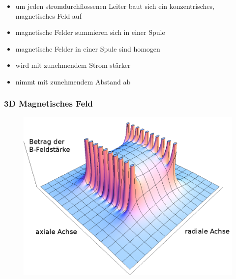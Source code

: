 \begin{frame}
\begin{center}
\begin{minipage}{0.45\textwidth}
\begin{center}
\begin{figure}
        \end{figure}
      \end{center}
    \end{minipage}
    \vspace{0.5cm}
    \begin{itemize}
      \item um jeden stromdurchflossenen Leiter baut sich ein konzentrisches, magnetisches Feld auf
      \item magnetische Felder summieren sich in einer Spule
      \item magnetische Felder in einer Spule sind homogen
      \item wird mit zunehmendem Strom stärker
      \item nimmt mit zunehmendem Abstand ab
    \end{itemize}
  \end{center}
\end{frame}

\begin{frame}
  \frametitle{3D Magnetisches Feld}
  \begin{center}
    \begin{figure}
      \includegraphics[width=1\textwidth,height=.75\textheight,keepaspectratio]{e06/3-D_HFeld.png}
    \end{figure}
  \end{center}
\end{frame}


